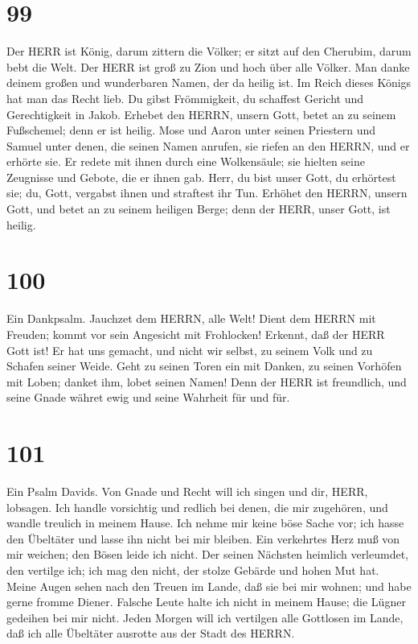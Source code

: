 \hypertarget{section-98}{%
\section{99}\label{section-98}}

 Der HERR ist König, darum zittern die Völker; er sitzt auf
den Cherubim, darum bebt die Welt.  Der HERR ist groß zu
Zion und hoch über alle Völker.  Man danke deinem großen und
wunderbaren Namen, der da heilig ist.  Im Reich dieses
Königs hat man das Recht lieb. Du gibst Frömmigkeit, du schaffest
Gericht und Gerechtigkeit in Jakob.  Erhebet den HERRN,
unsern Gott, betet an zu seinem Fußschemel; denn er ist heilig.
 Mose und Aaron unter seinen Priestern und Samuel unter
denen, die seinen Namen anrufen, sie riefen an den HERRN, und er erhörte
sie.  Er redete mit ihnen durch eine Wolkensäule; sie
hielten seine Zeugnisse und Gebote, die er ihnen gab.  Herr,
du bist unser Gott, du erhörtest sie; du, Gott, vergabst ihnen und
straftest ihr Tun.  Erhöhet den HERRN, unsern Gott, und
betet an zu seinem heiligen Berge; denn der HERR, unser Gott, ist
heilig.

\hypertarget{section-99}{%
\section{100}\label{section-99}}

 Ein Dankpsalm. Jauchzet dem HERRN, alle Welt! 
Dient dem HERRN mit Freuden; kommt vor sein Angesicht mit Frohlocken!
 Erkennt, daß der HERR Gott ist! Er hat uns gemacht, und
nicht wir selbst, zu seinem Volk und zu Schafen seiner Weide.
 Geht zu seinen Toren ein mit Danken, zu seinen Vorhöfen mit
Loben; danket ihm, lobet seinen Namen!  Denn der HERR ist
freundlich, und seine Gnade währet ewig und seine Wahrheit für und für.

\hypertarget{section-100}{%
\section{101}\label{section-100}}

 Ein Psalm Davids. Von Gnade und Recht will ich singen und
dir, HERR, lobsagen.  Ich handle vorsichtig und redlich bei
denen, die mir zugehören, und wandle treulich in meinem Hause.
 Ich nehme mir keine böse Sache vor; ich hasse den Übeltäter
und lasse ihn nicht bei mir bleiben.  Ein verkehrtes Herz
muß von mir weichen; den Bösen leide ich nicht.  Der seinen
Nächsten heimlich verleumdet, den vertilge ich; ich mag den nicht, der
stolze Gebärde und hohen Mut hat.  Meine Augen sehen nach
den Treuen im Lande, daß sie bei mir wohnen; und habe gerne fromme
Diener.  Falsche Leute halte ich nicht in meinem Hause; die
Lügner gedeihen bei mir nicht.  Jeden Morgen will ich
vertilgen alle Gottlosen im Lande, daß ich alle Übeltäter ausrotte aus
der Stadt des HERRN.

